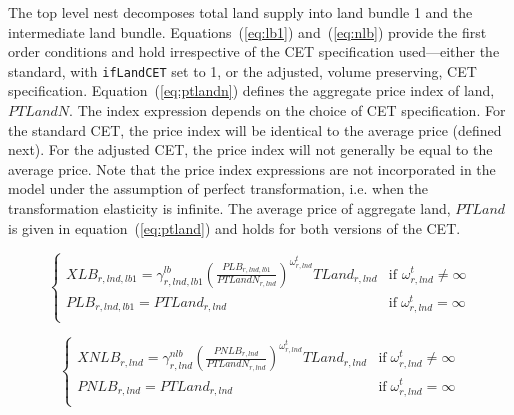 \documentclass[11pt,letterpaper]{report}
\begin{document}
The top level nest decomposes total land supply into land bundle 1 and the
intermediate land bundle. Equations~(\ref{eq:lb1}) and~(\ref{eq:nlb}) provide
the first order conditions and hold irrespective of the CET specification
used---either the standard, with \texttt{ifLandCET} set to 1, or the adjusted,
volume preserving, CET specification. Equation~(\ref{eq:ptlandn}) defines the
aggregate price index of land, $\mathit{PTLandN}$. The index expression depends
on the choice of CET specification. For the standard CET, the price index will
be identical to the average price (defined next). For the adjusted CET, the
price index will not generally be equal to the average price. Note that the
price index expressions are not incorporated in the model under the assumption
of perfect transformation, i.e. when the transformation elasticity is infinite.
The average price of aggregate land, $\mathit{PTLand}$ is given in
equation~(\ref{eq:ptland}) and holds for both versions of the CET.

\begin{equation}
\label{eq:lb1}
\begin{cases}
\displaystyle \mathit{XLB}_{r,\mathit{lnd},\mathit{lb1}} =
   \gamma^{\mathit{lb}}_{r,\mathit{lnd},\mathit{lb1}}
   \left( \frac{\mathit{PLB}_{r,\mathit{lnd},\mathit{lb1}}} {\mathit{PTLandN_{r,\mathit{lnd}}}}
   \right)^{\omega^t_{r,\mathit{lnd}}}
   \mathit{TLand_{r,\mathit{lnd}}}
& \textrm{if } \omega^t_{r,\mathit{lnd}} \ne \infty \\
\displaystyle \mathit{PLB}_{r,\mathit{lnd},\mathit{lb1}} = \mathit{PTLand_{r,\mathit{lnd}}}
& \textrm{if} \; \omega^t_{r,\mathit{lnd}} = \infty \\
\end{cases}
\end{equation}

\begin{equation}
\label{eq:nlb}
\begin{cases}
\displaystyle \mathit{XNLB}_{r,\mathit{lnd}} =
   \gamma^{\mathit{nlb}}_{r,\mathit{lnd}}
   \left( \frac{\mathit{PNLB}_{r,\mathit{lnd}}} {\mathit{PTLandN_{r,\mathit{lnd}}}}
   \right)^{\omega^t_{r,\mathit{lnd}}}
   \mathit{TLand_{r,\mathit{lnd}}}
&  \textrm{if} \; \omega^t_{r,\mathit{lnd}} \ne \infty \\
\displaystyle \mathit{PNLB}_{r,\mathit{lnd}} = \mathit{PTLand_{r,\mathit{lnd}}}
& \textrm{if} \; \omega^t_{r,\mathit{lnd}} = \infty \\
\end{cases}
\end{equation}
\end{document}
